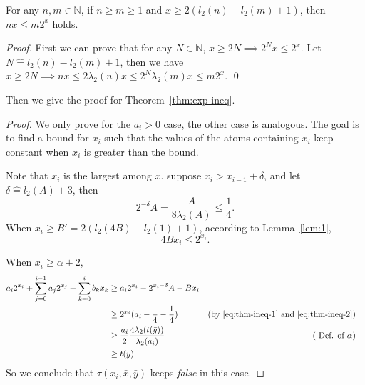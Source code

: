 \documentclass[runningheads]{llncs}
\newcommand{\Def}{\hat{=}}
\begin{document}
\begin{lemma} \label{lem:1}
For any $n,m\in \mathbb{N}$, if $n\ge m\ge 1$ and $x\ge 2(l_2(n)-l_2(m)+1)$, then 
$nx\le m2^x$ holds.
\end{lemma}

\begin{proof}
First we can prove that for any $N\in \mathbb{N}$, $x\ge 2N \implies 2^N x\le 2^x$. Let $N\Def l_2(n)-l_2(m)+1$, then we have $x\ge  2N \implies n x\le 2\lambda_2(n) x\le 2^N \lambda_2(m) x \le m 2^x $. \qed 
\end{proof}


Then we give the proof for Theorem~\ref{thm:exp-ineq}.
\begin{proof}
We only prove for the $a_i > 0$ case, the other case is analogous. 
The goal is to find a bound for $x_i$ such that 
the values of the atoms containing $x_i$ keep constant when $x_i$ is greater than the bound.

Note that $x_i$ is the largest among $\bar{x}$. 
suppose $x_i > x_{i-1} + \delta$, and let 
 $\delta \Def  l_2(A)+3$, then 
 \begin{equation} 
   2^{-\delta}A = \frac{A}{8\lambda_2(A)}\le \frac{1}{4}.   \label{eq:thm-ineq-1}
 \end{equation}
 When $x_i \ge B' = 2(l_2(4B)-l_2(1)+1)$, according to Lemma~\ref{lem:1}, 
\begin{equation} 
    4 B x_i \le 2^{x_i}. \label{eq:thm-ineq-2}
\end{equation}
 
When $x_i \ge \alpha+2$,
\begin{align}
    a_i2^{x_i}+ \sum_{j=0}^{i-1} a_j 2^{x_j} + \sum_{k=0}^{i} b_k x_k 
    & \ge a_i 2^{x_i} - 2^{x_i -\delta}A  - Bx_i & \notag \\
     & \ge 2^{x_i}(a_i -\frac{1}{4} -\frac{1}{4}) &  (\mbox{by \eqref{eq:thm-ineq-1} and  \eqref{eq:thm-ineq-2}})\notag \\
    & \ge  \frac{a_i}{2}\frac{4\lambda_2(t(\bar{y}))}{\lambda_2(a_i)} & 
      (\mbox{ Def. of } \alpha) & \notag \\
     & \ge  t(\bar{y}) & \notag 
\end{align}
So we conclude that %
$\tau(x_i,\bar{x},\bar{y})$ keeps \textit{false} in this case.


\end{proof}
\end{document}
